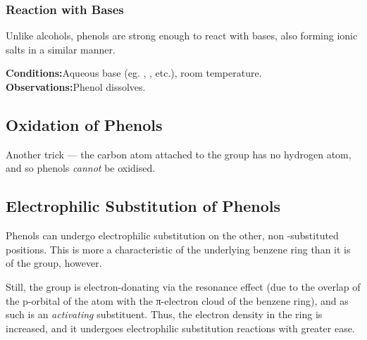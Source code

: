 
			\pagebreak
			\subsubsection{Reaction with Bases}

				Unlike alcohols, phenols are strong enough to react with bases, also forming ionic salts in a similar manner.


				\vspace{1.5em}
				\vbox{\textbf{Conditions:}\tabto{35mm}Aqueous base (eg. , , etc.), room temperature.}
				\vbox{\textbf{Observations:}\tabto{35mm}Phenol dissolves.}






		\subsection{Oxidation of Phenols}

			Another trick –– the carbon atom attached to the  group has no hydrogen atom, and so phenols \textit{cannot} be
			oxidised.



		\subsection{Electrophilic Substitution of Phenols}

			Phenols can undergo electrophilic substitution on the other, non -substituted positions. This is more a characteristic
			of the underlying benzene ring than it is of the  group, however.

			Still, the  group is electron-donating via the resonance effect (due to the overlap of the p-orbital of the  atom
			with the π-electron cloud of the benzene ring), and as such is an \textit{activating} substituent. Thus, the electron density
			in the ring is increased, and it undergoes electrophilic substitution reactions with greater ease.

